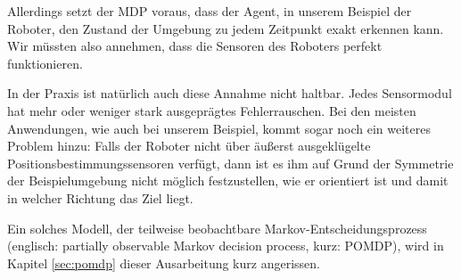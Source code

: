 \documentclass[a4paper]{IEEEtran}
\begin{document}
Allerdings setzt der MDP voraus, dass der Agent, in unserem Beispiel der Roboter, den Zustand der Umgebung zu jedem Zeitpunkt exakt erkennen kann. Wir müssten also annehmen, dass die Sensoren des Roboters perfekt funktionieren.

In der Praxis ist natürlich auch diese Annahme nicht haltbar. Jedes Sensormodul hat mehr oder weniger stark ausgeprägtes Fehlerrauschen. Bei den meisten Anwendungen, wie auch bei unserem Beispiel, kommt sogar noch ein weiteres Problem hinzu: Falls der Roboter nicht über äußerst ausgeklügelte Positionsbestimmungssensoren verfügt, dann ist es ihm auf Grund der Symmetrie der Beispielumgebung nicht möglich festzustellen, wie er orientiert ist und damit in welcher Richtung das Ziel liegt.

Ein solches Modell, der teilweise beobachtbare Markov-Entscheidungsprozess (englisch: partially observable Markov decision process, kurz: POMDP), wird in Kapitel \ref{sec:pomdp} dieser Ausarbeitung kurz angerissen.
\end{document}
